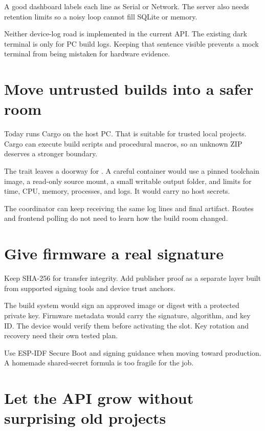 A good dashboard labels each line as Serial or Network. The server also needs retention limits so a noisy loop cannot fill SQLite or memory.

\begin{mentorbox}
Neither device-log road is implemented in the current API. The existing dark terminal is only for PC build logs. Keeping that sentence visible prevents a mock terminal from being mistaken for hardware evidence.
\end{mentorbox}

\section{Move untrusted builds into a safer room}

Today  runs Cargo on the host PC. That is suitable for trusted local projects. Cargo can execute build scripts and procedural macros, so an unknown ZIP deserves a stronger boundary.

The  trait leaves a doorway for . A careful container would use a pinned toolchain image, a read-only source mount, a small writable output folder, and limits for time, CPU, memory, processes, and logs. It would carry no host secrets.

The coordinator can keep receiving the same log lines and final artifact. Routes and frontend polling do not need to learn how the build room changed.

\section{Give firmware a real signature}

Keep SHA-256 for transfer integrity. Add publisher proof as a separate layer built from supported signing tools and device trust anchors.

The build system would sign an approved image or digest with a protected private key. Firmware metadata would carry the signature, algorithm, and key ID. The device would verify them before activating the slot. Key rotation and recovery need their own tested plan.

Use ESP-IDF Secure Boot and signing guidance when moving toward production. A homemade shared-secret formula is too fragile for the job.

\section{Let the API grow without surprising old projects}


